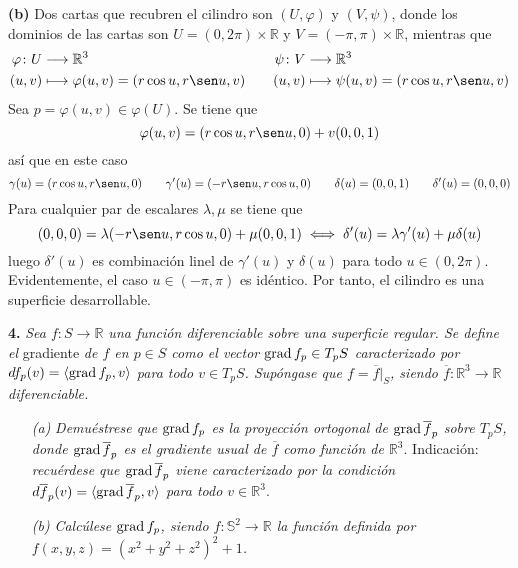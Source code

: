 \documentclass[12pt]{report}
\newcommand{\R}{\mathbb R}
\begin{document}
\vspace{2mm}
\textbf{(b) } Dos cartas que recubren el cilindro son $(U, \varphi)$ y $(V, \psi)$, donde los dominios de las cartas son $U = (0,2\pi) \times \R$ y $V = (-\pi,\pi) \times \R$, mientras que
\[
\begin{aligned}[t]
\varphi \colon U &\longrightarrow \R^3 \\
(u,v) & \longmapsto  \varphi(u,v) = (r\cos u, r\sen u, v)
\end{aligned} \qquad
\begin{aligned}[t]
\psi \colon V &\longrightarrow \R^3 \\
(u,v) & \longmapsto  \psi(u,v) = (r\cos u, r\sen u, v)
\end{aligned}
\]
Sea $p = \varphi(u,v) \in \varphi(U)$. Se tiene que
\[\varphi(u,v) = (r\cos u, r\sen u, 0) + v(0,0,1)\]
así que en este caso
\[\gamma(u) = (r\cos u, r\sen u, 0) \qquad \gamma'(u) = (-r\sen u, r\cos u, 0) \qquad \delta(u) = (0,0,1) \qquad \delta'(u) = (0,0,0)\]
Para cualquier par de escalares $\lambda,\mu$ se tiene que
\[(0,0,0) = \lambda(-r\sen u, r \cos u, 0) + \mu(0,0,1) \iff \delta'(u) = \lambda \gamma'(u) + \mu \delta(u)\]
luego $\delta'(u)$ es combinación linel de $\gamma'(u)$ y $\delta(u)$ para todo $u \in (0,2\pi)$. Evidentemente, el caso $u \in (-\pi, \pi)$ es idéntico. Por tanto, el cilindro es una superficie desarrollable.

\vspace{4mm}
\textbf{4. } \textit{Sea $f \colon S \to \R$ una función diferenciable sobre una superficie regular. Se define el} gradiente \textit{de $f$ en $p \in S$ como el vector $\textup{grad} \, f_p \in T_pS$ caracterizado por $df_p(v) = \langle \textup{grad} \, f_p,v \rangle$ para todo $v \in T_pS$. Supóngase que $f = \overline{f}|_S$, siendo $\overline{f} \colon \R^3 \to \R$ diferenciable.}
\begin{itemize}
    \item[\textit{(a)}] \textit{Demuéstrese que $\textup{grad} \, f_p$ es la proyección ortogonal de $\textup{grad} \, \overline{f}_p$ sobre $T_pS$, donde $\textup{grad} \, \overline{f}_p$ es el gradiente usual de $\overline{f}$ como función de $\R^3.$} Indicación: \textit{recuérdese que $\textup{grad} \, \overline{f}_p$ viene caracterizado por la condición $d\overline{f}_p(v) = \langle \textup{grad} \, \overline{f}_p,v \rangle$ para todo $v \in \R^3$}.
    \item[\textit{(b)}] \textit{Calcúlese $\textup{grad} \, f_p$, siendo $f \colon \mathbb{S}^2 \to \R$ la función definida por $f(x,y,z) = (x^2+y^2+z^2)^2+1$.}
\end{itemize}
\end{document}
